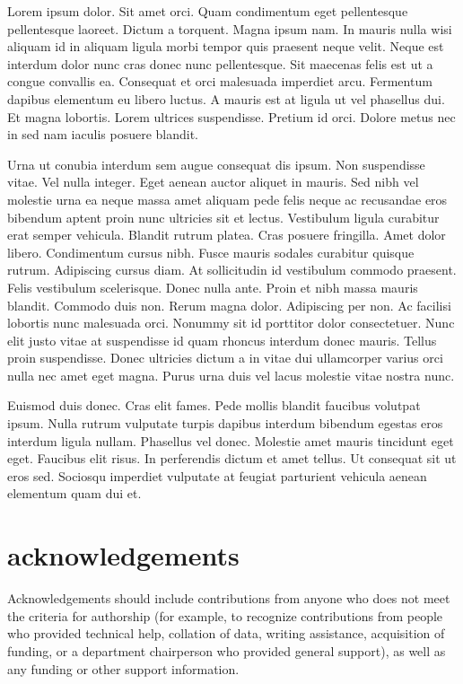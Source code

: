 \documentclass[alpha-refs,serif]{ecotropicos-article}
\begin{document}
\begin{multicols}{2}

Lorem ipsum dolor. Sit amet orci. Quam condimentum eget pellentesque pellentesque laoreet. Dictum a torquent. Magna ipsum nam. In mauris nulla wisi aliquam id in aliquam ligula morbi tempor quis praesent neque velit. Neque est interdum dolor nunc cras donec nunc pellentesque. Sit maecenas felis est ut a congue convallis ea. Consequat et orci malesuada imperdiet arcu. Fermentum dapibus elementum eu libero luctus. A mauris est at ligula ut vel phasellus dui. Et magna lobortis. Lorem ultrices suspendisse. Pretium id orci. Dolore metus nec in sed nam iaculis posuere blandit.

Urna ut conubia interdum sem augue consequat dis ipsum. Non suspendisse vitae. Vel nulla integer. Eget aenean auctor aliquet in mauris. Sed nibh vel molestie urna ea neque massa amet aliquam pede felis neque ac recusandae eros bibendum aptent proin nunc ultricies sit et lectus. Vestibulum ligula curabitur erat semper vehicula. Blandit rutrum platea. Cras posuere fringilla. Amet dolor libero. Condimentum cursus nibh. Fusce mauris sodales curabitur quisque rutrum. Adipiscing cursus diam. At sollicitudin id vestibulum commodo praesent. Felis vestibulum scelerisque. Donec nulla ante. Proin et nibh massa mauris blandit. Commodo duis non. Rerum magna dolor. Adipiscing per non. Ac facilisi lobortis nunc malesuada orci. Nonummy sit id porttitor dolor consectetuer. Nunc elit justo vitae at suspendisse id quam rhoncus interdum donec mauris. Tellus proin suspendisse. Donec ultricies dictum a in vitae dui ullamcorper varius orci nulla nec amet eget magna. Purus urna duis vel lacus molestie vitae nostra nunc.

Euismod duis donec. Cras elit fames. Pede mollis blandit faucibus volutpat ipsum. Nulla rutrum vulputate turpis dapibus interdum bibendum egestas eros interdum ligula nullam. Phasellus vel donec. Molestie amet mauris tincidunt eget eget. Faucibus elit risus. In perferendis dictum et amet tellus. Ut consequat sit ut eros sed. Sociosqu imperdiet vulputate at feugiat parturient vehicula aenean elementum quam dui et.




\section*{acknowledgements}
Acknowledgements should include contributions from anyone who does not meet the criteria for authorship (for example, to recognize contributions from people who provided technical help, collation of data, writing assistance, acquisition of funding, or a department chairperson who provided general support), as well as any funding or other support information.


\end{multicols}
\end{document}
